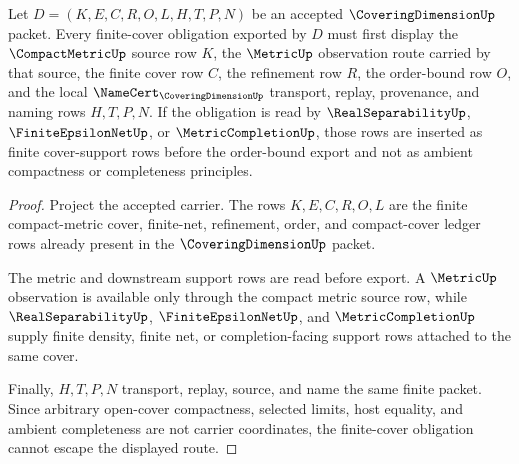 \begin{theorem}
\label{thm:covering-dimension-finite-cover-obligations}
Let $D=(K,E,C,R,O,L,H,T,P,N)$ be an accepted $\CoveringDimensionUp$ packet. Every finite-cover obligation exported by $D$ must first display the $\CompactMetricUp$ source row $K$, the $\MetricUp$ observation route carried by that source, the finite cover row $C$, the refinement row $R$, the order-bound row $O$, and the local $\NameCert_{\CoveringDimensionUp}$ transport, replay, provenance, and naming rows $H,T,P,N$. If the obligation is read by $\RealSeparabilityUp$, $\FiniteEpsilonNetUp$, or $\MetricCompletionUp$, those rows are inserted as finite cover-support rows before the order-bound export and not as ambient compactness or completeness principles.
\end{theorem}
\begin{proof}
Project the accepted carrier. The rows $K,E,C,R,O,L$ are the finite compact-metric cover, finite-net, refinement, order, and compact-cover ledger rows already present in the $\CoveringDimensionUp$ packet.

The metric and downstream support rows are read before export. A $\MetricUp$ observation is available only through the compact metric source row, while $\RealSeparabilityUp$, $\FiniteEpsilonNetUp$, and $\MetricCompletionUp$ supply finite density, finite net, or completion-facing support rows attached to the same cover.

Finally, $H,T,P,N$ transport, replay, source, and name the same finite packet. Since arbitrary open-cover compactness, selected limits, host equality, and ambient completeness are not carrier coordinates, the finite-cover obligation cannot escape the displayed route.
\end{proof}

